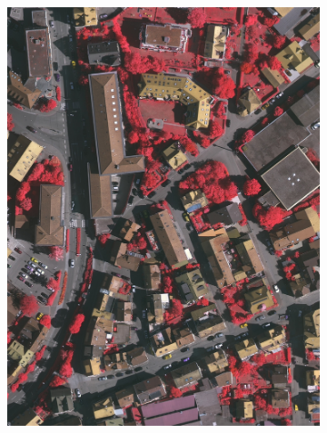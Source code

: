 \begin{figure}[htb]
\begin{subfigure}{0.19\textwidth}
  \centering
  \includegraphics[width=1\linewidth]{fig/vai/1_irg.JPG}
  

\end{subfigure}
\end{figure}
